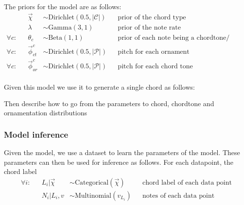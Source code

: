 \documentclass[12pt,a4paper,twoside,openright]{report}
\theoremstyle{definition}
\begin{document}
\par
The priors for the model are as follows:
\begin{equation}
\begin{align*} 
              && \vec{\chi} &\sim \text{Dirichlet}(0.5, |\mathcal{C}|)     && \text{prior of the chord type} \\
              && \lambda &\sim \text{Gamma}(3, 1)     && \text{prior of the note rate} \\
  \forall c:  && \theta_c  &\sim \text{Beta}(1, 1)        && \text{prior of each note being a chordtone/ ornament} \\
  \forall c:  && \vec{\phi}_{ct}^{c}  &\sim \text{Dirichlet}(0.5, |\mathcal{P}|)        && \text{pitch for each ornament} \\
  \forall c:  && \vec{\phi}_{or}^{c}  &\sim \text{Dirichlet}(0.5, |\mathcal{P}|)        && \text{pitch for each chord tone} \\
\end{align*}
\label{eq:phm}
\end{equation}
\par 
Given this model we use it to generate a single chord as follows:

\par
Then describe how to go from the parameters to chord, chordtone and ornamentation distributions
\par

\subsubsection{Model inference}
Given the model, we use a dataset to learn the parameters of the model. These parameters can then be used for inference as follows.
For each datapoint, the chord label 
\begin{equation}
\begin{align*} 
  \forall i:  && L_i | \vec{\chi} &\sim \text{Categorical}(\vec{\chi}) && \text{chord label of each data point} \\
              && N_i | L_i, v &\sim \text{Multinomial}(v_{L_i})  && \text{notes of each data point} \\
\end{align*}
\label{eq:chordlabeldp}
\end{equation}
\end{document}
